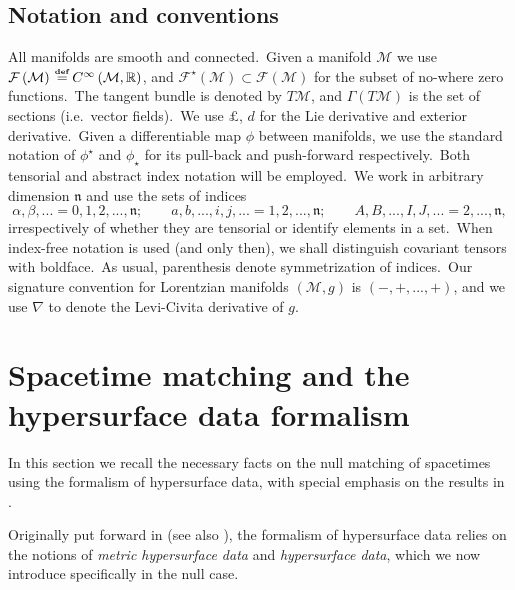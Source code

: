 \documentclass[11pt]{article}
\numberwithin{equation}{section}
\def\defi{{\stackrel{\mbox{\tiny {\textbf{def}}}}{\,\, = \,\, }}}
\newcommand\M{\mathcal M}
\def\defi{{\stackrel{\mbox{\tiny \textup{\textbf{def}}}}{\,\, = \,\, }}}
\newcommand{\lp}{\left(}
\newcommand{\rp}{\right)}
\newcommand{\tcte}{}%
\begin{document}
 
\subsection{Notation and conventions}
All manifolds are smooth and connected.\ Given a manifold $\M$ we use $\mathcal{F}\lp\mathcal{M}\rp\defi C^{\infty}\lp\mathcal{M},\mathbb{R}\rp$, and $\mathcal{F}^{\star}\lp\mathcal{M}\rp\subset\mathcal{F}\lp\mathcal{M}\rp$ for the subset of no-where zero functions.\  The tangent bundle is denoted 
by $T\mathcal{M}$, and $\Gamma\lp T\mathcal{M}\rp$ is the set
of sections (i.e.\ vector fields).\  We use $\pounds$, $d$ for the Lie derivative and exterior derivative.\ Given a differentiable
map $\phi$ between manifolds, we use the standard notation of $\phi^{\star}$ and $\phi_{\star}$ for
its pull-back and push-forward respectively.\ Both tensorial and abstract index notation will be employed.\ We work in arbitrary dimension $\mathfrak{n}$ and use the sets of indices
\begin{equation}
	\label{notation}
	\alpha,\beta,...=0,1,2,...,\mathfrak{n};\qquad a,b,...,i,j,...=1,2,...,\mathfrak{n};\qquad A,B,...,I,J,...=2,...,\mathfrak{n},
\end{equation}
\tcte{irrespectively of whether they are tensorial or identify elements in a set}.\ When index-free notation is used (and only then), we shall distinguish
covariant tensors with boldface.\ As usual, parenthesis denote symmetrization of indices.\ Our signature convention for Lorentzian manifolds $\lp \mathcal{M},g\rp$ is $(-,+, ... ,+)$, and we use $\nabla$ to denote the Levi-Civita derivative of $g$.



\section{Spacetime matching and the hypersurface data formalism}\label{sec:matching:2021}


In this section we recall the necessary facts on the null matching of spacetimes using the formalism of hypersurface data, with special emphasis on the results in \cite{manzano2021null,manzano2022general, manzano2023matching}.

Originally put forward in \cite{mars2013constraint,mars2020hypersurface} (see also \cite{manzano2023field,manzano2023constraint,mars2024transverseI,mars2024transverseII}), the formalism of hypersurface data relies on the notions of \textit{metric hypersurface data} and \textit{hypersurface data}, which we now introduce specifically in the null case. 
\end{document}
